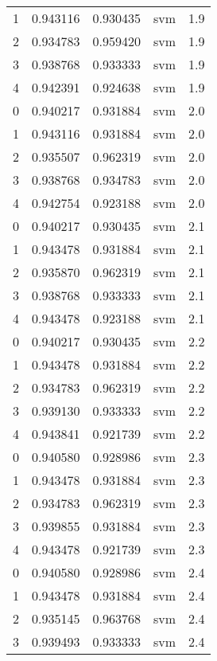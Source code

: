 \begin{tabular}{rrrlr}
     1 & 0.943116 & 0.930435 &      svm &        1.9 \\
     2 & 0.934783 & 0.959420 &      svm &        1.9 \\
     3 & 0.938768 & 0.933333 &      svm &        1.9 \\
     4 & 0.942391 & 0.924638 &      svm &        1.9 \\
     0 & 0.940217 & 0.931884 &      svm &        2.0 \\
     1 & 0.943116 & 0.931884 &      svm &        2.0 \\
     2 & 0.935507 & 0.962319 &      svm &        2.0 \\
     3 & 0.938768 & 0.934783 &      svm &        2.0 \\
     4 & 0.942754 & 0.923188 &      svm &        2.0 \\
     0 & 0.940217 & 0.930435 &      svm &        2.1 \\
     1 & 0.943478 & 0.931884 &      svm &        2.1 \\
     2 & 0.935870 & 0.962319 &      svm &        2.1 \\
     3 & 0.938768 & 0.933333 &      svm &        2.1 \\
     4 & 0.943478 & 0.923188 &      svm &        2.1 \\
     0 & 0.940217 & 0.930435 &      svm &        2.2 \\
     1 & 0.943478 & 0.931884 &      svm &        2.2 \\
     2 & 0.934783 & 0.962319 &      svm &        2.2 \\
     3 & 0.939130 & 0.933333 &      svm &        2.2 \\
     4 & 0.943841 & 0.921739 &      svm &        2.2 \\
     0 & 0.940580 & 0.928986 &      svm &        2.3 \\
     1 & 0.943478 & 0.931884 &      svm &        2.3 \\
     2 & 0.934783 & 0.962319 &      svm &        2.3 \\
     3 & 0.939855 & 0.931884 &      svm &        2.3 \\
     4 & 0.943478 & 0.921739 &      svm &        2.3 \\
     0 & 0.940580 & 0.928986 &      svm &        2.4 \\
     1 & 0.943478 & 0.931884 &      svm &        2.4 \\
     2 & 0.935145 & 0.963768 &      svm &        2.4 \\
     3 & 0.939493 & 0.933333 &      svm &        2.4 \\

\end{tabular}
